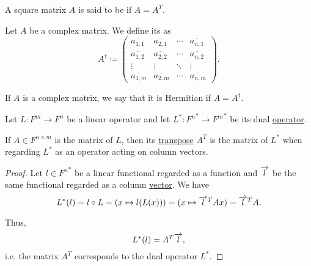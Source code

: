 \begin{definition}\label{def:symmetric_matrix}
  A square matrix \( A \) is said to be  if \( A = A^T \).
\end{definition}

\begin{definition}\label{def:matrix_conjugate_transpose}
  Let \( A \) be a complex matrix. We define its  as
  \begin{equation*}
    A^\dagger \coloneqq \begin{pmatrix}
      \overline{a_{1,1}} & \overline{a_{2,1}} & \cdots & \overline{a_{n,1}} \\
      \overline{a_{1,2}} & \overline{a_{2,2}} & \cdots & \overline{a_{n,2}} \\
      \vdots       & \vdots       & \ddots & \vdots       \\
      \overline{a_{1,m}} & \overline{a_{2,m}} & \cdots & \overline{a_{n,m}}
    \end{pmatrix}.
  \end{equation*}
\end{definition}

\begin{definition}\label{def:hermitian_matrix}
  If \( A \) is a complex matrix, we say that it is Hermitian if \( A = A^\dagger \).
\end{definition}

\begin{proposition}\label{thm:dual_linear_operator_matrix_transpose}
  Let \( L: F^m \to F^n \) be a linear operator and let \( L^*: {F^n}^* \to {F^m}^* \) be its dual \hyperref[def:dual_linear_operator]{operator}.

  If \( A \in F^{n \times m} \) is the matrix of \( L \), then its \hyperref[def:matrix_transpose]{transpose} \( A^T \) is the matrix of \( L^* \) when regarding \( L^* \) as an operator acting on column vectors.
\end{proposition}
\begin{proof}
  Let \( l \in {F^n}^* \) be a linear functional regarded as a function and \( \overrightarrow{l} \) be the same functional regarded as a column \hyperref[rem:finite_dimensional_dual_space_isomorphism]{vector}. We have
  \begin{equation*}
    L^*(l)
    =
    l \circ L
    =
    (x \mapsto l(L(x)))
    =
    (x \mapsto \overrightarrow{l}^T Ax)
    =
    \overrightarrow{l}^T A.
  \end{equation*}

  Thus,
  \begin{equation*}
    L^*(l) = A^T \overrightarrow{l},
  \end{equation*}
  i.e. the matrix \( A^T \) corresponds to the dual operator \( L^* \).
\end{proof}

